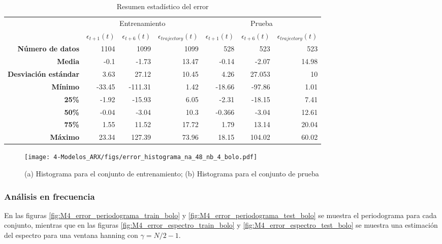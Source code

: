 \begin{table}[H]
	\centering
	\begin{tabular}{rrrr|rrr}
		\hline \hline
		& \multicolumn{3}{c|}{Entrenamiento} & \multicolumn{3}{c}{Prueba} \\
		& $\epsilon_{t+1}(t)$  & $\epsilon_{t+6}(t)$       & $\epsilon_{trajectory}(t)$     & $\epsilon_{t+1}(t)$      & $\epsilon_{t+6}(t)$      &$\epsilon_{trajectory}(t)$     \\ \hline
		\textbf{Número de datos}     & 1104       & 1099      & 1099      & 528     & 523     & 523    \\
		\textbf{Media}               & -0.1       & -1.73     & 13.47     & -0.14   & -2.07   & 14.98  \\
		\textbf{Desviación estándar} & 3.63       & 27.12     & 10.45     & 4.26    & 27.053  & 10     \\
		\textbf{Mínimo}              & -33.45     & -111.31   & 1.42      & -18.66  & -97.86  & 1.01   \\
		\textbf{25\%}                & -1.92      & -15.93    & 6.05      & -2.31   & -18.15  & 7.41   \\
		\textbf{50\%}                & -0.04      & -3.04     & 10.3      & -0.366  & -3.04   & 12.61  \\
		\textbf{75\%}                & 1.55       & 11.52     & 17.72     & 1.79    & 13.14   & 20.04  \\
		\textbf{Máximo}              & 23.34      & 127.39    & 73.96     & 18.15   & 104.02  & 60.02  \\ \hline \hline
	\end{tabular}
	\caption{Resumen estadístico del error}
	\label{table:M4_error_bolo}
\end{table}




\begin{figure}[H]
	\centering
	\texttt{[image: 4-Modelos\_ARX/figs/error\_histograma\_na\_48\_nb\_4\_bolo.pdf]}
	\caption{(a) Histograma para el conjunto de entrenamiento; (b) Histograma para el conjunto de prueba}
	\label{fig:M4_histograma_error_bolo}
\end{figure}



\subsubsection*{Análisis en frecuencia}


En las figuras \ref{fig:M4_error_periodograma_train_bolo} y \ref{fig:M4_error_periodograma_test_bolo} se muestra el periodograma para cada conjunto, mientras que en las figuras \ref{fig:M4_error_espectro_train_bolo} y \ref{fig:M4_error_espectro_test_bolo} se muestra una estimación del espectro para una ventana hanning con $\gamma = N/2 - 1$.

